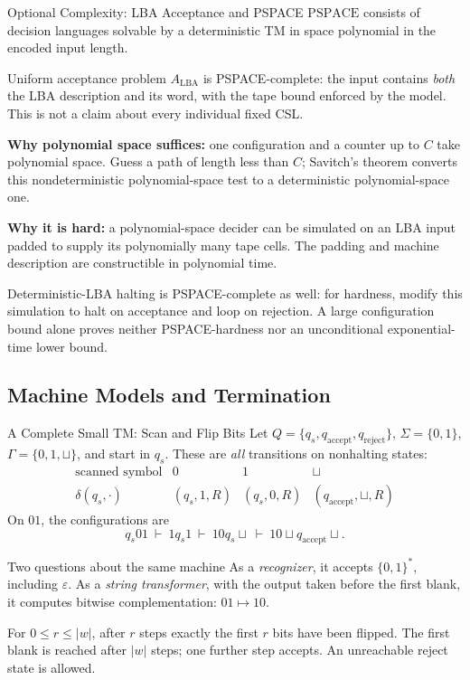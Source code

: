 \documentclass[10pt]{beamer}
\begin{document}
\begin{frame}{Optional Complexity: LBA Acceptance and PSPACE}
  \small
  $\mathrm{PSPACE}$ consists of decision languages solvable by a deterministic
  TM in space polynomial in the encoded input length.
  \begin{block}{Uniform acceptance problem \cite{lba-complexity}}
    $A_{\mathrm{LBA}}$ is PSPACE-complete: the input contains \emph{both}
    the LBA description and its word, with the tape bound enforced by the
    model. This is not a claim about every individual fixed CSL.
  \end{block}
  \textbf{Why polynomial space suffices:} one configuration and a counter
  up to $C$ take polynomial space. Guess a path of length less than $C$;
  Savitch's theorem converts this nondeterministic polynomial-space test
  to a deterministic polynomial-space one.
  \par\smallskip
  \textbf{Why it is hard:} a polynomial-space decider can be simulated
  on an LBA input padded to supply its polynomially many tape cells.
  The padding and machine description are constructible in polynomial time.
  \par\smallskip
  Deterministic-LBA halting is PSPACE-complete as well: for hardness,
  modify this simulation to halt on acceptance and loop on rejection.
  A large configuration bound alone proves neither PSPACE-hardness nor
  an unconditional exponential-time lower bound.
\end{frame}

\subsection{Machine Models and Termination}

\begin{frame}{A Complete Small TM: Scan and Flip Bits}
  \small
  Let $Q=\{q_s,q_{\mathrm{accept}},q_{\mathrm{reject}}\}$,
  $\Sigma=\{0,1\}$, $\Gamma=\{0,1,\sqcup\}$, and start in $q_s$.
  These are \emph{all} transitions on nonhalting states:
  \[
    \begin{array}{c|ccc}
      \text{scanned symbol}&0&1&\sqcup\\\hline
      \delta(q_s,\cdot)&(q_s,1,R)&(q_s,0,R)&(q_{\mathrm{accept}},\sqcup,R)
    \end{array}
  \]
  On $01$, the configurations are
  \[
    q_s01\ \vdash\ 1q_s1\ \vdash\ 10q_s\sqcup
    \ \vdash\ 10\sqcup q_{\mathrm{accept}}\sqcup.
  \]
  \begin{block}{Two questions about the same machine}
    As a \emph{recognizer}, it accepts $\{0,1\}^*$, including $\varepsilon$.
    As a \emph{string transformer}, with the output taken before the first
    blank, it computes bitwise complementation: $01\mapsto10$.
  \end{block}
  For $0\le r\le|w|$, after $r$ steps exactly the first $r$ bits have been flipped.
  The first blank is reached after $|w|$ steps; one further step accepts.
  An unreachable reject state is allowed.
\end{frame}
\end{document}
